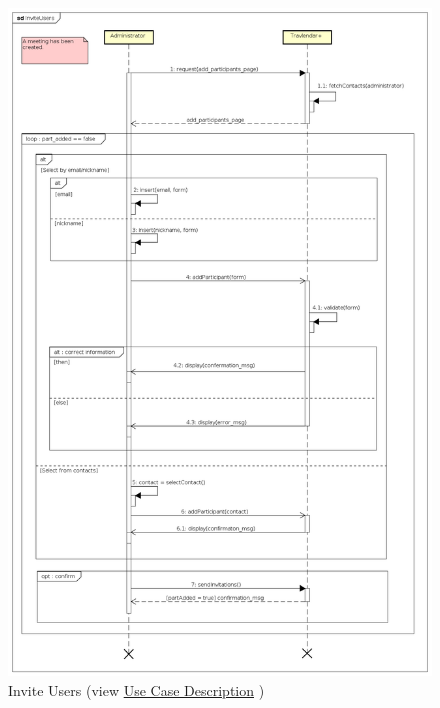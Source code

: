 \begin{figure}[H]
\centering\includegraphics[height=\textheight]{Images/SequenceDiagrams/Admin/InviteUsers.png}{}
\caption[Invite Users]{{Invite Users}\label{SeqDiagr:InviteUsers} (view \hyperref[UseCaseDescr:InviteUsers]{Use Case Description} )}
\end{figure}

